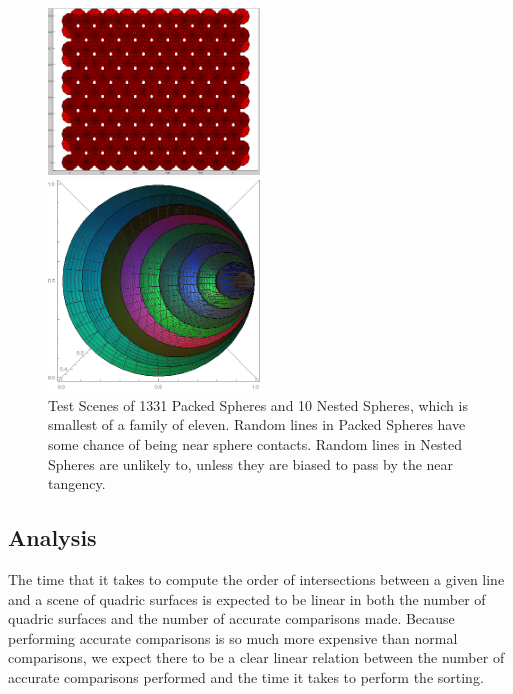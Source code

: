 \documentclass{cccg16}
\begin{document}
\begin{figure}
  \includegraphics[width=0.5\textwidth]{imgs/packedSpheres.png}
  \vspace{5mm}
  
  \includegraphics[width=0.5\textwidth]{imgs/hardEllipsoidsSingle.png}
  \caption{Test Scenes of 1331 Packed Spheres and 10 Nested Spheres,
    which is smallest of a family of eleven.  Random lines in Packed
    Spheres have some chance of being near sphere contacts.  Random
    lines in Nested Spheres are unlikely to, unless they are biased to
    pass by the near tangency.}
  \label{fig:testScenes}
\end{figure}

\subsection{Analysis}
The time that it takes to compute the order of intersections between a
given line and a scene of quadric surfaces is expected to be linear in
both the number of quadric surfaces and the number of accurate
comparisons made.  Because performing accurate comparisons is so much
more expensive than normal comparisons, we expect there to be a clear
linear relation between the number of accurate comparisons performed
and the time it takes to perform the sorting.
\end{document}
